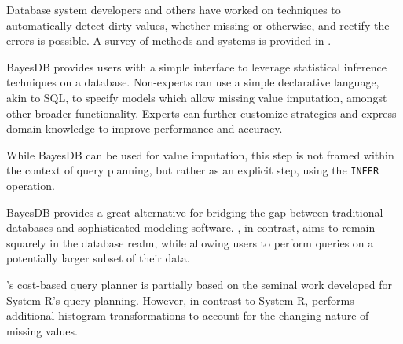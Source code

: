 Database system developers and others have worked on techniques to automatically
detect dirty values, whether missing or otherwise, and rectify the errors is
possible. A survey of methods and systems is provided in
\cite{hellerstein2008quantitative}.

BayesDB \cite{mansinghka2015bayesdb} provides users with a simple interface to 
leverage statistical inference techniques on a database. Non-experts
can use a simple declarative language, akin to SQL, to specify models
which allow missing value imputation, amongst other broader functionality.
Experts can further customize strategies and express domain knowledge to
improve performance and accuracy.

While BayesDB can be used for value imputation, this step is not framed
within the context of query planning, but rather as an explicit step, using the
\verb|INFER| operation. 

BayesDB provides a great alternative for bridging the gap between
traditional databases and sophisticated modeling software. \ProjectName{}, in
contrast, aims to remain squarely in the database realm, while allowing
users to perform queries on a potentially larger subset of their data.

\ProjectName's cost-based query planner 
is partially based on the seminal work developed for System R's query planning\cite{blasgen1981system}.
However, in contrast to System R, \ProjectName{} performs additional histogram transformations to account
for the changing nature of missing values.





